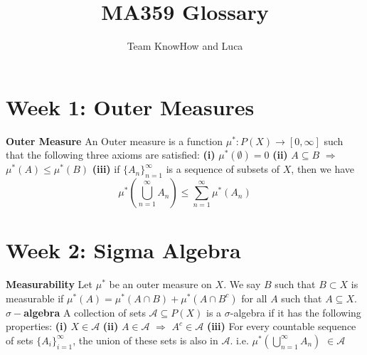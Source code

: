 \documentclass{article}
\title{MA359 Glossary}
\author{Team KnowHow and Luca}
\begin{document}
\maketitle

\section{Week 1: Outer Measures}
\textbf{Outer Measure} An Outer measure is a function $\mu^{*}: P(X) \rightarrow [0, \infty]$ such that the following three axioms are satisfied:
\newline \textbf{(i)} $\mu^{*}(\emptyset) = 0$
\newline \textbf{(ii)} $A \subseteq B$ $\Rightarrow$ $\mu^{*}(A) \leq \mu^{*}(B)$
\newline \textbf{(iii)} if $\{A_n\}_{n=1}^{\infty}$ is a sequence of subsets of $X$, then we have \[ \mu^{*}(\bigcup\limits_{n=1}^{\infty}A_n) \leq \sum_{n=1}^{\infty} \mu^{*}(A_n) \]
\section{Week 2: Sigma Algebra}
\textbf{Measurability} Let $\mu^{*}$ be an outer measure on $X$. We say $B$ such that $B \subset X$ is measurable if $\mu^{*}(A) = \mu^{*}(A \cap B) + \mu^{*}(A \cap B^{c})$ for all $A$ such that $A \subseteq X$.
\newline \newline \textbf{$\sigma-$algebra} A collection of sets $\mathcal{A} \subseteq P(X)$  is a $\sigma$-algebra if it has the following properties:
\newline \textbf{(i)} $X \in \mathcal{A}$
\newline \textbf{(ii)} $A \in \mathcal{A}$ $\Rightarrow$ $A^{c} \in \mathcal{A}$
\newline \textbf{(iii)} For every countable sequence of sets $\{A_i\}_{i=1}^{\infty}$, the union of these sets is also in $\mathcal{A}$. i.e. $\mu^{*}(\bigcup\limits_{n=1}^{\infty}A_n)$ $\in \mathcal{A}$
\end{document}
